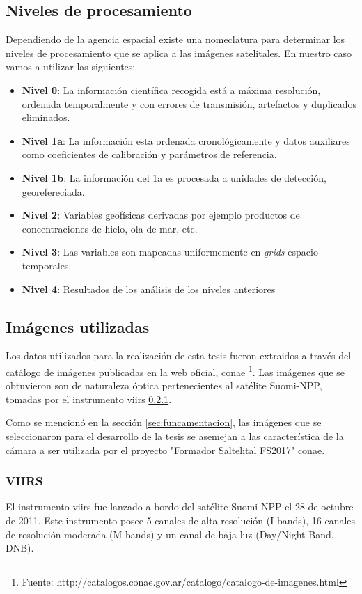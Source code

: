 \subsection{Niveles de procesamiento}\label{sub:nivelesdeprocesamiento}
Dependiendo de la agencia espacial existe una nomeclatura para determinar los niveles de procesamiento que se aplica a las imágenes satelitales. En nuestro caso vamos a utilizar las siguientes:
\begin{itemize}
	\item \textbf{Nivel 0}: La información científica recogida está a máxima resolución, ordenada temporalmente y con errores de transmisión, artefactos y duplicados eliminados.
 	\item \textbf{Nivel 1a}: La información esta ordenada cronológicamente y datos auxiliares como coeficientes de calibración y parámetros de referencia.
 	\item \textbf{Nivel 1b}: La información del 1a es procesada a unidades de detección, georefereciada.
 	\item \textbf{Nivel 2}: Variables geofísicas derivadas por ejemplo productos de concentraciones de hielo, ola de mar, etc.
 	\item \textbf{Nivel 3}: Las variables son mapeadas uniformemente en \textit{grids} espacio-temporales.
 	\item \textbf{Nivel 4}: Resultados de los análisis de los niveles anteriores
\end{itemize}


\subsection{Imágenes utilizadas}\label{sub:datosutilizados}
Los datos utilizados para la realización de esta tesis fueron extraidos a través del catálogo de imágenes publicadas en la web oficial, \ac{conae} \footnote{Fuente: http://catalogos.conae.gov.ar/catalogo/catalogo-de-imagenes.html}. Las imágenes que se obtuvieron son de naturaleza óptica pertenecientes al satélite Suomi-NPP, tomadas por el instrumento \ac{viirs} \ref{sub:viirs}.

Como se mencionó en la sección \ref{sec:funcamentacion}, las imágenes que se seleccionaron para el desarrollo de la tesis se asemejan a las característica de la cámara a ser utilizada por el proyecto "Formador Saltelital FS2017"  \ac{conae}.

\subsubsection{VIIRS}\label{sub:viirs}
El instrumento \ac{viirs} fue lanzado a bordo del satélite Suomi-NPP el 28 de octubre de 2011. Este instrumento posee 5 canales de alta resolución (I-bands), 16 canales de resolución moderada (M-bands) y un canal de baja luz (Day/Night Band, DNB). 

